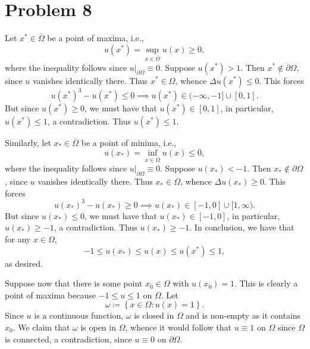\documentclass[10pt]{amsart}
\theoremstyle{thmstyle}
\theoremstyle{defstyle}
\renewcommand{\le}{\leqslant}
\renewcommand{\ge}{\geqslant}
\begin{document}
\section{Problem 8}

Let $x^\ast\in\overline\Omega$ be a point of maxima, i.e., 
\begin{equation*}
    u(x^\ast) = \sup_{x\in\overline\Omega} u(x)\ge 0,
\end{equation*}
where the inequality follows since $u|_{\partial\Omega}\equiv 0$.  
Suppose $u(x^\ast) > 1$. Then $x^\ast\notin\partial\Omega$, since $u$ vanishes identically there. Thus $x^\ast\in\Omega$, whence $\Delta u(x^\ast)\le 0$. This forces 
\begin{equation*}
    u(x^\ast)^3 - u(x^\ast)\le 0\implies u(x^\ast)\in (-\infty, -1]\cup[0, 1].
\end{equation*}
But since $u(x^\ast)\ge 0$, we must have that $u(x^\ast)\in [0, 1]$, in particular, $u(x^\ast)\le 1$, a contradiction. Thus $u(x^\ast)\le 1$.

Similarly, let $x_\ast\in\overline\Omega$ be a point of minima, i.e., 
\begin{equation*}
    u(x_\ast) = \inf_{x\in\overline\Omega} u(x)\le 0,
\end{equation*}
where the inequality follows since $u|_{\partial\Omega}\equiv 0$. Suppose $u(x_\ast) < -1$. Then $x_\ast\notin\partial\Omega$, since $u$ vanishes identically there. Thus $x_\ast\in\Omega$, whence $\Delta u(x_\ast)\ge 0$. This forces 
\begin{equation*}
    u(x_\ast)^3 - u(x_\ast) \ge 0\implies u(x_\ast)\in[-1, 0]\cup[1,\infty).
\end{equation*}
But since $u(x_\ast)\le 0$, we must have that $u(x_\ast)\in[-1, 0]$, in particular, $u(x_\ast)\ge -1$, a contradiction. Thus $u(x_\ast)\ge -1$. In conclusion, we have that for any $x\in\Omega$, 
\begin{equation*}
    -1\le u(x_\ast)\le u(x)\le u(x^\ast)\le 1,
\end{equation*}
as desired.

Suppose now that there is some point $x_0\in\Omega$ with $u(x_0) = 1$. This is clearly a point of maxima because $-1\le u\le 1$ on $\Omega$. Let 
\begin{equation*}
    \omega \coloneq\left\{x\in\Omega\colon u(x) = 1\right\}.
\end{equation*}
Since $u$ is a continuous function, $\omega$ is closed in $\Omega$ and is non-empty as it contains $x_0$. We claim that $\omega$ is open in $\Omega$, whence it would follow that $u\equiv 1$ on $\Omega$ since $\Omega$ is connected, a contradiction, since $u\equiv 0$ on $\partial\Omega$. 
\end{document}
